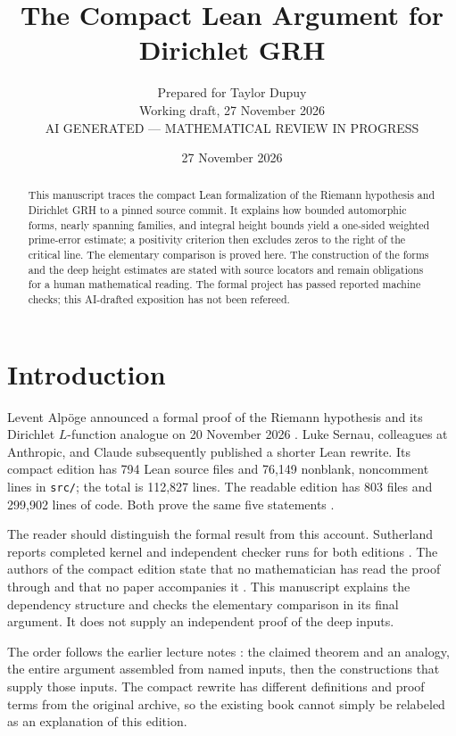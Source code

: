 \documentclass[11pt,oneside,openany]{amsbook}
\theoremstyle{remark}
\numberwithin{equation}{section}
\begin{document}
\begin{abstract}
This manuscript traces the compact Lean formalization of the
Riemann hypothesis and Dirichlet GRH to a pinned source commit. It
explains how bounded automorphic forms, nearly spanning families,
and integral height bounds yield a one-sided weighted prime-error
estimate; a positivity criterion then excludes zeros to the right
of the critical line. The elementary comparison is proved here.
The construction of the forms and the deep height estimates are
stated with source locators and remain obligations for a human
mathematical reading. The formal project has passed reported
machine checks; this AI-drafted exposition has not been refereed.
\end{abstract}
\title{The Compact Lean Argument for Dirichlet GRH}
\author{Prepared for Taylor Dupuy\\[2ex]
  Working draft, 27 November 2026\\[1ex]
  AI GENERATED --- MATHEMATICAL REVIEW IN PROGRESS}
\date{27 November 2026}
\maketitle
\tableofcontents

\chapter*{Introduction}
Levent Alp\"oge announced a formal proof of the Riemann hypothesis
and its Dirichlet $L$-function analogue on 20 November 2026
\cite[pp.~1--4]{Alpoge2026}. Luke Sernau, colleagues at Anthropic,
and Claude subsequently published a shorter Lean rewrite. Its compact
edition has 794 Lean source files and 76,149 nonblank, noncomment
lines in \texttt{src/}; the total is 112,827 lines. The readable
edition has 803 files and 299,902 lines of code. Both prove the same
five statements \cite[Summary]{Sutherland2026}.

The reader should distinguish the formal result from this account.
Sutherland reports completed kernel and independent checker runs for
both editions \cite[Summary and What was verified]{Sutherland2026}.
The authors of the compact edition state that no mathematician has
read the proof through and that no paper accompanies it
\cite[Status]{Sernau2026}. This manuscript explains the dependency
structure and checks the elementary comparison in its final argument.
It does not supply an independent proof of the deep inputs.

The order follows the earlier lecture notes \cite[Chs.~1--3]{Dupuy2026}:
the claimed theorem and an analogy, the entire argument assembled
from named inputs, then the constructions that supply those inputs.
The compact rewrite has different definitions and proof terms from
the original archive, so the existing book cannot simply be relabeled
as an explanation of this edition.
\end{document}
